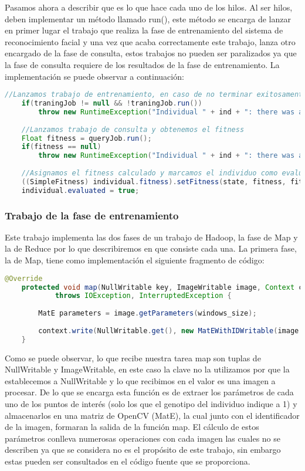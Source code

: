 Pasamos ahora a describir que es lo que hace cada uno de los hilos. Al ser hilos, deben implementar un m\'etodo llamado run(), este método se encarga de lanzar en primer lugar el trabajo que realiza la fase de entrenamiento del sistema de reconocimiento facial y una vez que acaba correctamente este trabajo, lanza otro encargado de la fase de consulta, estos trabajos no pueden ser paralizados ya que la fase de consulta requiere de los resultados de la fase de entrenamiento. La implementación se puede observar a continuación:

 \begin{lstlisting}[language=Java]
 	//Lanzamos trabajo de entrenamiento, en caso de no terminar exitosamente lanzamos una excepcion
	if(traningJob != null && !traningJob.run())
		throw new RuntimeException("Individual " + ind + ": there was a problem during the training phase");
		
	//Lanzamos trabajo de consulta y obtenemos el fitness
	Float fitness = queryJob.run();
	if(fitness == null)
		throw new RuntimeException("Individual " + ind + ": there was a problem during the query phase");
			
	//Asignamos el fitness calculado y marcamos el individuo como evaluado
	((SimpleFitness) individual.fitness).setFitness(state, fitness, fitness >= 1F);
	individual.evaluated = true;	
\end{lstlisting}

\subsubsection{Trabajo de la fase de entrenamiento}

Este trabajo implementa las dos fases de un trabajo de Hadoop, la fase de Map y la de Reduce por lo que describiremos en que consiste cada una. La primera fase, la de Map, tiene como implementación el siguiente fragmento de c\'odigo:

 \begin{lstlisting}[language=Java]
	@Override
	protected void map(NullWritable key, ImageWritable image, Context context)
			throws IOException, InterruptedException {
		
		MatE parameters = image.getParameters(windows_size);
		
		context.write(NullWritable.get(), new MatEWithIDWritable(image.getId(), parameters));
	}
\end{lstlisting}

Como se puede observar, lo que recibe nuestra tarea map son tuplas de NullWritable y ImageWritable, en este caso la clave no la utilizamos por que la establecemos a NullWritable y lo que recibimos en el valor es una imagen a procesar. De lo que se encarga esta función es de extraer los parámetros de cada uno de los puntos de interés (solo los que el genotipo del individuo indique a 1) y almacenarlos en una matriz de OpenCV (MatE), la cual junto con el identificador de la imagen, formaran la salida de la función map. El c\'alculo de estos parámetros conlleva numerosas operaciones con cada imagen las cuales no se describen ya que se considera no es el propósito de este trabajo, sin embargo estas pueden ser consultados en el código fuente que se proporciona.

